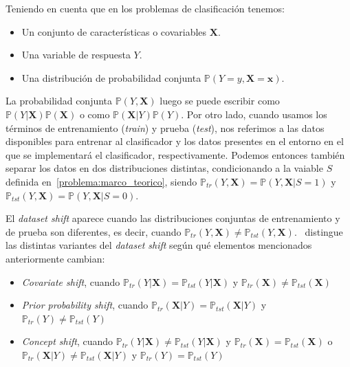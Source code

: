 Teniendo en cuenta que en los problemas de clasificación tenemos:

\begin{itemize}
    \item Un conjunto de características o covariables $\boldsymbol{X}$.
    \item Una variable de respuesta $Y$.
    \item Una distribución de probabilidad conjunta
    $\mathbb{P}(Y=y,\boldsymbol{X=x})$.
\end{itemize}

La probabilidad conjunta $\mathbb{P}(Y,\boldsymbol{X})$ luego se puede escribir
como $\mathbb{P}(Y|\boldsymbol{X})\mathbb{P}(\boldsymbol{X})$ o como
$\mathbb{P}(\boldsymbol{X}|Y)\mathbb{P}(Y)$. Por otro lado, cuando usamos los
términos de entrenamiento ({\it train\/}) y prueba ({\it test\/}), nos referimos
a las datos disponibles para entrenar al clasificador y los datos presentes en
el entorno en el que se implementará el clasificador, respectivamente. Podemos
entonces también separar los datos en dos distribuciones distintas,
condicionando a la vaiable $S$ definida en~\ref{problema:marco_teorico}, siendo
$\mathbb{P}_{tr}(Y,\boldsymbol{X})=\mathbb{P}(Y,\boldsymbol{X}|S=1)$ y
$\mathbb{P}_{tst}(Y,\boldsymbol{X})=\mathbb{P}(Y,\boldsymbol{X}|S=0)$.

El {\it dataset shift\/} aparece cuando las distribuciones conjuntas de
entrenamiento y de prueba son diferentes, es decir, cuando
$\mathbb{P}_{tr}(Y,\boldsymbol{X}) \neq
\mathbb{P}_{tst}(Y,\boldsymbol{X})$.~\citet{moreno2012unifying} distingue las
distintas variantes del {\it dataset shift\/} según qué elementos mencionados
anteriormente cambian:

\begin{itemize}
    \item {\it Covariate shift}, cuando $\mathbb{P}_{tr}(Y|\boldsymbol{X}) =
    \mathbb{P}_{tst}(Y|\boldsymbol{X})$ y $\mathbb{P}_{tr}(\boldsymbol{X}) \neq
    \mathbb{P}_{tst}(\boldsymbol{X})$
    \item {\it Prior probability shift}, cuando
    $\mathbb{P}_{tr}(\boldsymbol{X}|Y) = \mathbb{P}_{tst}(\boldsymbol{X}|Y)$ y
    $\mathbb{P}_{tr}(Y) \neq \mathbb{P}_{tst}(Y)$
    \item {\it Concept shift}, cuando $\mathbb{P}_{tr}(Y|\boldsymbol{X}) \neq
    \mathbb{P}_{tst}(Y|\boldsymbol{X})$ y $\mathbb{P}_{tr}(\boldsymbol{X}) =
    \mathbb{P}_{tst}(\boldsymbol{X})$ o $\mathbb{P}_{tr}(\boldsymbol{X}|Y) \neq
    \mathbb{P}_{tst}(\boldsymbol{X}|Y)$ y $\mathbb{P}_{tr}(Y) =
    \mathbb{P}_{tst}(Y)$
\end{itemize}

